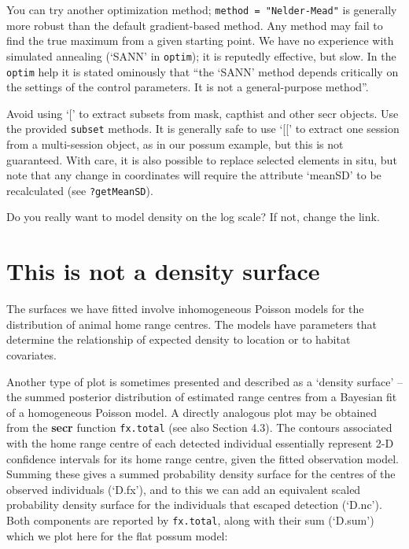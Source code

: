 \documentclass[
]{book}
\begin{document}
You can try another optimization method; \texttt{method\ =\ "Nelder-Mead"} is generally more robust than the default gradient-based method. Any method may fail to find the true maximum from a given starting point. We have no experience with simulated annealing (`SANN' in \texttt{optim}); it is reputedly effective, but slow. In the \texttt{optim} help it is stated ominously that ``the `SANN' method depends critically on the settings of the control parameters. It is not a general-purpose method''.

Avoid using `{[}' to extract subsets from mask, capthist and other secr objects. Use the provided \texttt{subset} methods. It is generally safe to use `{[}{[}' to extract one session from a multi-session object, as in our possum example, but this is not guaranteed. With care, it is also possible to replace selected elements in situ, but note that any change in coordinates will require the attribute `meanSD' to be recalculated (see \texttt{?getMeanSD}).

Do you really want to model density on the log scale? If not, change the link.

\section{This is not a density surface}\label{this-is-not-a-density-surface}


The surfaces we have fitted involve inhomogeneous Poisson models for the distribution of animal home range centres. The models have parameters that determine the relationship of expected density to location or to habitat covariates.

Another type of plot is sometimes presented and described as a `density surface' -- the summed posterior distribution of estimated range centres from a Bayesian fit of a homogeneous Poisson model. A directly analogous plot may be obtained from the \textbf{secr} function \texttt{fx.total} (see also \citet{be08} Section 4.3). The contours associated with the home range centre of each detected individual essentially represent 2-D confidence intervals for its home range centre, given the fitted observation model. Summing these gives a summed probability density surface for the centres of the observed individuals (`D.fx'), and to this we can add an equivalent scaled probability density surface for the individuals that escaped detection (`D.nc'). Both components are reported by \texttt{fx.total}, along with their sum (`D.sum') which we plot here for the flat possum model:
\end{document}
